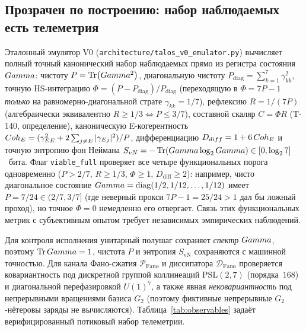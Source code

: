 \subsection{Прозрачен по построению: набор наблюдаемых есть телеметрия}
\label{subsec:telemetry}

Эталонный эмулятор V0 (\texttt{architecture/talos\_v0\_emulator.py}) вычисляет
полный точный канонический набор наблюдаемых прямо из регистра состояния $Gamma$:
чистоту $P=\Tr(Gamma^2)$, диагональную чистоту
$P_{\mathrm{diag}}=\sum_{k=1}^7\gamma_{kk}^2$, точную HS-интеграцию
$\Phi=(P-P_{\mathrm{diag}})/P_{\mathrm{diag}}$ (переходящую в $\Phi=7P-1$
\emph{только} на равномерно-диагональной страте $\gamma_{kk}=1/7$), рефлексию
$R=1/(7P)$ (алгебраически эквивалентно $R\ge 1/3\Leftrightarrow P\le 3/7$),
составной скаляр $C=\Phi R$ (T-140, определение), каноническую E-когерентность
$Coh_E=(\gamma_{EE}^2+2\sum_{j\neq E}|\gamma_{Ej}|^2)/P$, дифференциацию
$D_{diff}=1+6\,Coh_E$ и точную энтропию фон Неймана
$S_{vN}=-\Tr(Gamma\log_2Gamma)\in[0,\log_2 7]$~бита. Флаг
\texttt{viable\_full} проверяет все четыре функциональных порога одновременно
($P>2/7$, $R\ge 1/3$, $\Phi\ge 1$, $D_{\mathrm{diff}}\ge 2$): например, чисто
диагональное состояние $Gamma=\operatorname{diag}(1/2,1/12,\ldots,1/12)$ имеет
$P=7/24\in(2/7,3/7]$ (где неверный прокси $7P-1=25/24>1$ дал бы ложный проход),
но точное $\Phi=0$ немедленно его отвергает. Связь этих функциональных метрик с
субъективным опытом требует независимых эмпирических наблюдений.

Для контроля исполнения унитарный полушаг сохраняет \emph{спектр} $Gamma$,
поэтому $\Tr Gamma=1$, чистота $P$ и энтропия $S_{\mathrm{vN}}$ сохраняются с
машинной точностью. Для канала Фано-сжатия $\mathcal{P}_{\mathrm{Fano}}$ и
диссипатора $\mathcal{D}_{\mathrm{Fano}}$ проверяется ковариантность под
дискретной группой коллинеаций $\mathrm{PSL}(2,7)$ (порядка~$168$) и
диагональной перефазировкой $U(1)^7$, а также явная \emph{нековариантность} под
непрерывными вращениями базиса $G_2$ (поэтому фиктивные непрерывные
$G_2$-нётеровы заряды не вычисляются). Таблица~\ref{tab:observables} задаёт
верифицированный потиковый набор телеметрии.

